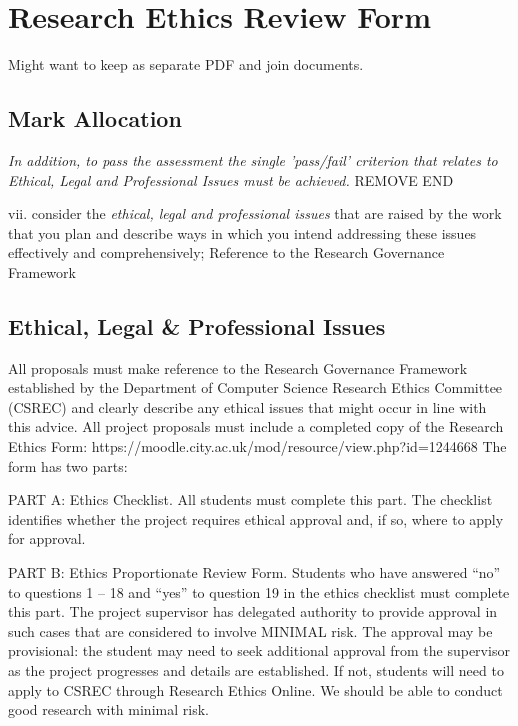 \section*{Research Ethics Review Form}
Might want to keep as separate PDF and join documents. 

\subsection{Mark Allocation}

\textit{In addition, to pass the assessment the single 'pass/fail' criterion that relates to Ethical, Legal and Professional Issues must be achieved.}
REMOVE END

vii. consider the \textit{ethical, legal and professional issues} that are raised by the work that you plan and describe ways in which you intend addressing these issues effectively and comprehensively; 
Reference to the Research Governance Framework \parencite{Other:2019RGF}

\subsection{Ethical, Legal \& Professional Issues}

All proposals must make reference to the Research Governance Framework established by the Department of Computer Science Research Ethics Committee (CSREC) and clearly describe any ethical issues that might occur in line with this advice.
All project proposals must include a completed copy of the Research Ethics Form:   https://moodle.city.ac.uk/mod/resource/view.php?id=1244668 
The form has two parts:

PART A: Ethics Checklist. All students must complete this part.  The checklist identifies whether the project requires ethical approval and, if so, where to apply for approval.


PART B: Ethics Proportionate Review Form. Students who have answered “no” to questions 1 – 18 and “yes” to question 19 in the ethics checklist must complete this part. The project supervisor has delegated authority to provide approval in such cases that are considered to involve MINIMAL risk. 
The approval may be provisional: the student may need to seek additional approval from the supervisor as the project progresses and details are established. If not, students will need to apply to CSREC through Research Ethics Online.  We should be able to conduct good research with minimal risk.
                       
